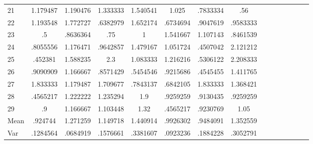 \documentclass[a4paper,12pt]{article}
\begin{document}
\begin{landscape}
\begin{footnotesize}
\begin{center}
\begin{longtable}{lcccccccccccccc|}
21&1.179487&1.190476&1.333333&1.540541&1.025&.7833334&.56&&&&&&& \\
22&1.193548&1.772727&.6382979&1.652174&.6734694&.9047619&.9583333&&&&&&& \\
23&.5&.8636364&.75&1&1.541667&1.107143&.8461539&&&&&&& \\
24&.8055556&1.176471&.9642857&1.479167&1.051724&.4507042&2.121212&&&&&&& \\
25&.452381&1.588235&2.3&1.083333&1.216216&.5306122&2.208333&&&&&&& \\
26&.9090909&1.166667&.8571429&.5454546&.9215686&.4545455&1.411765&&&&&&& \\
27&1.833333&1.179487&1.709677&.7843137&.6842105&1.833333&1.368421&&&&&&& \\
28&.4565217&1.222222&1.235294&1.9&.9259259&.9130435&.9259259&&&&&&& \\
29&.9&1.166667&1.103448&1.32&.4565217&.9230769&1.05&&&&&&& \\
Mean&.924744&1.271259&1.149718&1.440914&.9926302&.9484091&1.352559&&&&&&& \\
Var&.1284564&.0684919&.1576661&.3381607&.0923236&.1884228&.3052791&&&&&&& \\ \hline
\end{longtable}
\end{center}
\end{footnotesize}
\end{landscape}
\end{document}
